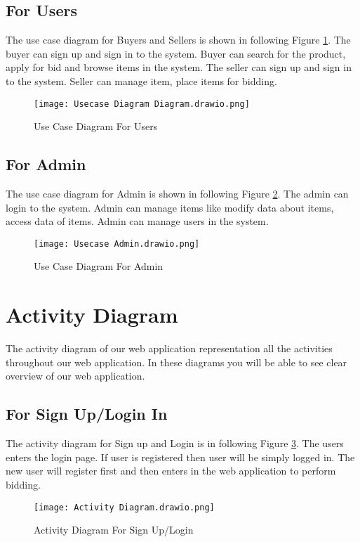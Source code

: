 \subsection{For Users}
The use case diagram for Buyers and Sellers is shown in following Figure \ref{fig:UCD1}. The buyer can sign up and sign in to the system. Buyer can search for the product, apply for bid and browse items in the system. The seller can sign up and sign in to the system. Seller can manage item, place items for bidding. \\
\begin{figure}[!h]
    \centering
    \texttt{[image: Usecase Diagram Diagram.drawio.png]}
    \caption{Use Case Diagram For Users}
    \label{fig:UCD1}
\end{figure}
\newpage
\subsection{For Admin}
The use case diagram for Admin is shown in following Figure   \ref{fig:UCD2}. The admin can login to the system. Admin can manage items like modify data about items, access data of items. Admin can manage users in the system.\\
\begin{figure}[!h]
    \centering
    \texttt{[image: Usecase Admin.drawio.png]}
    \caption{Use Case Diagram For Admin}
    \label{fig:UCD2}
\end{figure}

\section{Activity Diagram}
The activity diagram of our web application representation all the activities throughout our web application. In these diagrams you will be able to see clear overview of our web application.

\subsection{For Sign Up/Login In}
The activity diagram for Sign up and Login is in following Figure \ref{fig:AD1}. The users enters the login page. If user is registered then user will be simply logged in. The new user will register first and then enters in the web application to perform bidding. \\
\begin{figure}[!h]
    \centering
    \texttt{[image: Activity Diagram.drawio.png]}
    \caption{Activity Diagram For Sign Up/Login}
    \label{fig:AD1}
\end{figure}

